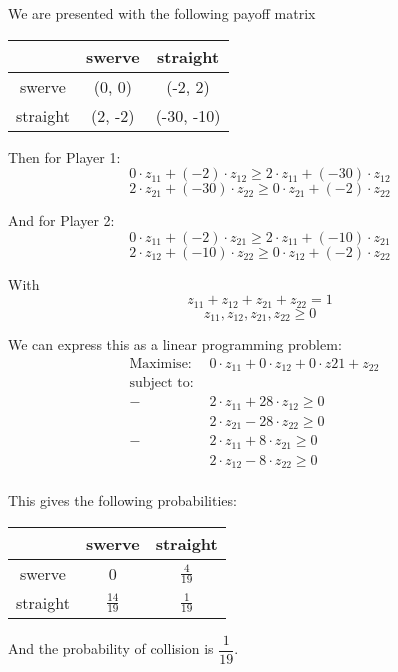 \documentclass[11pt,journal]{article}
\begin{document}
	We are presented with the following payoff matrix
	\begin{table}[h]
		\centering
		\begin{tabular}{c|c|c|}
			
			& swerve & straight \\
			\hline
			swerve &(0, 0) & (-2, 2) \\
			\hline
			straight & (2, -2) & (-30, -10) \\
			\hline
		\end{tabular}
	\end{table}
	
	Then for Player 1:
	\[0 \cdot z_{11} + (-2)\cdot z_{12} \geq 2\cdot z_{11} + (-30) \cdot z_{12}  \]
	\[ 2 \cdot z_{21} + (-30) \cdot z_{22} \geq 0 \cdot z_{21} + (-2) \cdot z_{22}  \]
	
	And for Player 2:
	\[ 0 \cdot z_{11} + (-2) \cdot z_{21} \geq 2 \cdot z_{11} + (-10) \cdot z_{21}  \]
	\[ 2 \cdot z_{12} + (-10) \cdot z_{22} \geq 0 \cdot z_{12} + (-2) \cdot z_{22} \]
	
	With
	\[ z_{11} + z_{12} + z_{21} + z_{22} =1 \]
	\[ z_{11}, z_{12}, z_{21}, z_{22} \geq 0  \]
	
	We can express this as a linear programming problem:
	\begin{align*}
		\text{Maximise: } & 0\cdot z_{11} + 0 \cdot z_{12} + 0 \cdot z{21} + z_{22} &\\
		\text{subject to: } & &\\
		 -&2\cdot z_{11} + 28\cdot z_{12} \geq 0\\
		& 2 \cdot z_{21} - 28 \cdot z_{22}  \geq 0\\
		 -&2 \cdot z_{11} + 8 \cdot z_{21} \geq 0\\
		& 2 \cdot z_{12} -8 \cdot z_{22} \geq 0 \\
	\end{align*}
	
	This gives the following probabilities:
	
	\begin{table}[h]
		\centering
		\begin{tabular}{c|c|c|}
			
			& swerve & straight \\
			\hline
			swerve & 0 & $\frac{4}{19}$ \\
			\hline
			straight & $\frac{14}{19}$ & $\frac{1}{19}$ \\
			\hline
		\end{tabular}
	\end{table}
	And the probability of collision is $\dfrac{1}{19}$. 
	
\end{document}
